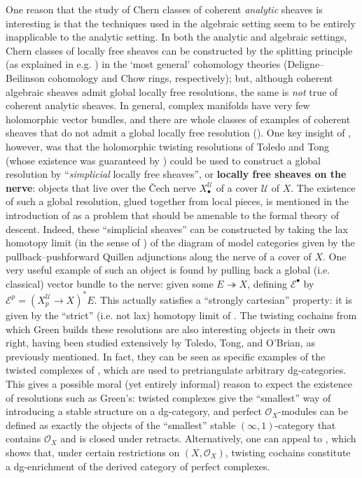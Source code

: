 \documentclass[11pt,fleqn]{article}
\theoremstyle{plain}
\theoremstyle{definition}
\theoremstyle{remark}
\numberwithin{equation}{theorem}
\newcommand{\cover}{\mathcal{U}}
\newcommand{\OO}{\mathcal{O}}
\newcommand{\define}[1]{\textbf{#1}}
\newcommand{\nerve}[1]{X_{#1}^\cover}
\begin{document}
    One reason that the study of Chern classes of coherent \emph{analytic} sheaves is interesting is that the techniques used in the algebraic setting seem to be entirely inapplicable to the analytic setting.
    In both the analytic and algebraic settings, Chern classes of locally free sheaves can be constructed by the splitting principle (as explained in e.g. \cite[§21]{Bott&Tu1982}) in the `most general' cohomology theories (Deligne--Beilinson cohomology and Chow rings, respectively); but, although coherent algebraic sheaves admit global locally free resolutions, the same is \emph{not} true of coherent analytic sheaves.
    In general, complex manifolds have very few holomorphic vector bundles, and there are whole classes of examples of coherent sheaves that do not admit a global locally free resolution (\cite[Corollary~A.5]{Voisin2002}).
    One key insight of \cite{Green1980}, however, was that the holomorphic twisting resolutions of Toledo and Tong (whose existence was guaranteed by \cite[Proposition~2.4]{Toledo&Tong1978}) could be used to construct a global resolution by ``\emph{simplicial} locally free sheaves'', or \define{locally free sheaves on the nerve}: objects that live over the Čech nerve $\nerve{\bullet}$ of a cover $\cover$ of $X$.
    The existence of such a global resolution, glued together from local pieces, is mentioned in the introduction of \cite{Hirschowitz&Simpson2001} as a problem that should be amenable to the formal theory of descent.
    Indeed, these ``simplicial sheaves'' can be constructed by taking the lax homotopy limit (in the sense of \cite[Definition~3.1]{Bergner2012}) of the diagram of model categories given by the pullback--pushforward Quillen adjunctions along the nerve of a cover of $X$.
    One very useful example of such an object is found by pulling back a global (i.e. classical) vector bundle to the nerve: given some $E\twoheadrightarrow X$, defining $\mathcal{E}^\bullet$ by $\mathcal{E}^p=(\nerve{p}\to X)^*E$.
    This actually satisfies a ``strongly cartesian'' property: it is given by the ``strict'' (i.e. not lax) homotopy limit of \cite{Bergner2012}.
    The twisting cochains from which Green builds these resolutions are also interesting objects in their own right, having been studied extensively by Toledo, Tong, and O'Brian, as previously mentioned.
    In fact, they can be seen as specific examples of the twisted complexes of \cite{Bondal&Kapranov1991}, which are used to pretriangulate arbitrary dg-categories.
    This gives a possible moral (yet entirely informal) reason to expect the existence of resolutions such as Green's: twisted complexes give the ``smallest'' way of introducing a stable structure on a dg-category, and perfect $\OO_X$-modules can be defined as exactly the objects of the ``smallest'' stable $(\infty,1)$-category that contains $\OO_X$ and is closed under retracts.
    Alternatively, one can appeal to \cite{Wei2016}, which shows that, under certain restrictions on $(X,\OO_X)$, twisting cochains constitute a dg-enrichment of the derived category of perfect complexes.
\end{document}
